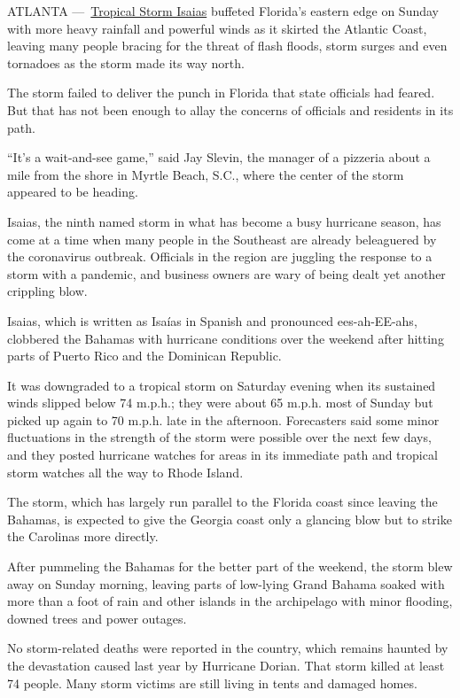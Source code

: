 ATLANTA
---~\href{https://www.nytimes.com/2020/08/03/us/isaias-storm-updates.html}{Tropical
Storm Isaias} buffeted Florida's eastern edge on Sunday with more heavy
rainfall and powerful winds as it skirted the Atlantic Coast, leaving
many people bracing for the threat of flash floods, storm surges and
even tornadoes as the storm made its way north.

The storm failed to deliver the punch in Florida that state officials
had feared. But that has not been enough to allay the concerns of
officials and residents in its path.

``It's a wait-and-see game,'' said Jay Slevin, the manager of a pizzeria
about a mile from the shore in Myrtle Beach, S.C., where the center of
the storm appeared to be heading.

Isaias, the ninth named storm in what has become a busy hurricane
season, has come at a time when many people in the Southeast are already
beleaguered by the coronavirus outbreak. Officials in the region are
juggling the response to a storm with a pandemic, and business owners
are wary of being dealt yet another crippling blow.

Isaias, which is written as Isaías in Spanish and pronounced
ees-ah-EE-ahs, clobbered the Bahamas with hurricane conditions over the
weekend after hitting parts of Puerto Rico and the Dominican Republic.

It was downgraded to a tropical storm on Saturday evening when its
sustained winds slipped below 74 m.p.h.; they were about 65 m.p.h. most
of Sunday but picked up again to 70 m.p.h. late in the afternoon.
Forecasters said some minor fluctuations in the strength of the storm
were possible over the next few days, and they posted hurricane watches
for areas in its immediate path and tropical storm watches all the way
to Rhode Island.

The storm, which has largely run parallel to the Florida coast since
leaving the Bahamas, is expected to give the Georgia coast only a
glancing blow but to strike the Carolinas more directly.

After pummeling the Bahamas for the better part of the weekend, the
storm blew away on Sunday morning, leaving parts of low-lying Grand
Bahama soaked with more than a foot of rain and other islands in the
archipelago with minor flooding, downed trees and power outages.

No storm-related deaths were reported in the country, which remains
haunted by the devastation caused last year by Hurricane Dorian. That
storm killed at least 74 people. Many storm victims are still living in
tents and damaged homes.

